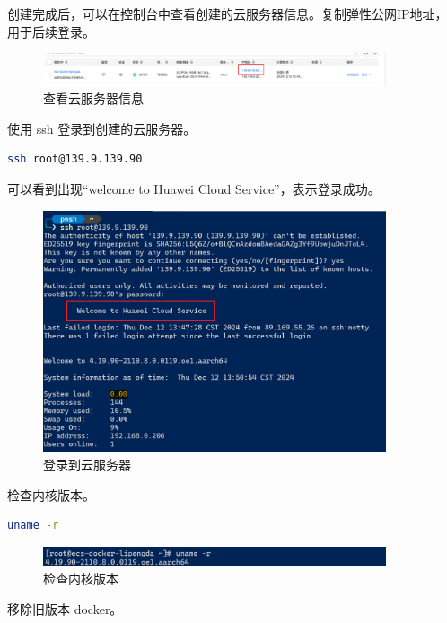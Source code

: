 \documentclass{article}
\begin{document}
创建完成后，可以在控制台中查看创建的云服务器信息。复制弹性公网IP地址，用于后续登录。

\begin{figure}[H]
\centering
\includegraphics[width=0.9\textwidth]{img/0.1.png}
\caption{查看云服务器信息}
\end{figure}

使用 ssh 登录到创建的云服务器。

\begin{lstlisting}[language=bash]
    ssh root@139.9.139.90
\end{lstlisting}

可以看到出现“welcome to Huawei Cloud Service”，表示登录成功。

\begin{figure}[H]
\centering
\includegraphics[width=0.9\textwidth]{img/0.2.png}
\caption{登录到云服务器}
\end{figure}

检查内核版本。

\begin{lstlisting}[language=bash]
    uname -r
\end{lstlisting}

\begin{figure}[H]
\centering
\includegraphics[width=0.9\textwidth]{img/1.4.9.png}
\caption{检查内核版本}
\end{figure}

移除旧版本 docker。
\end{document}
